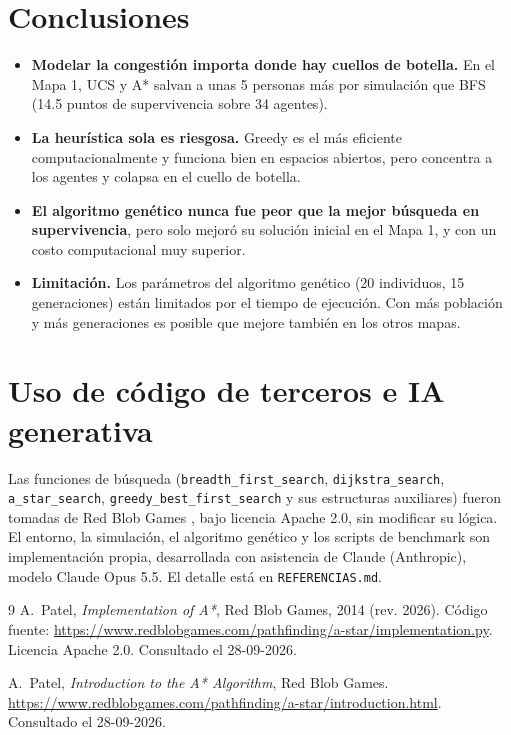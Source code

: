\documentclass[11pt,a4paper]{article}
\begin{document}
\section{Conclusiones}

\begin{itemize}
    \item \textbf{Modelar la congestión importa donde hay cuellos de botella.} En el Mapa 1, UCS y A* salvan a unas 5 personas más por simulación que BFS (14.5 puntos de supervivencia sobre 34 agentes).
    \item \textbf{La heurística sola es riesgosa.} Greedy es el más eficiente computacionalmente y funciona bien en espacios abiertos, pero concentra a los agentes y colapsa en el cuello de botella.
    \item \textbf{El algoritmo genético nunca fue peor que la mejor búsqueda en supervivencia}, pero solo mejoró su solución inicial en el Mapa 1, y con un costo computacional muy superior.
    \item \textbf{Limitación.} Los parámetros del algoritmo genético (20 individuos, 15 generaciones) están limitados por el tiempo de ejecución. Con más población y más generaciones es posible que mejore también en los otros mapas.
\end{itemize}

\section*{Uso de código de terceros e IA generativa}

Las funciones de búsqueda (\texttt{breadth\_first\_search}, \texttt{dijkstra\_search}, \texttt{a\_star\_search}, \texttt{greedy\_best\_first\_search} y sus estructuras auxiliares) fueron tomadas de Red Blob Games \cite{redblob-impl,redblob-intro}, bajo licencia Apache 2.0, sin modificar su lógica. El entorno, la simulación, el algoritmo genético y los scripts de benchmark son implementación propia, desarrollada con asistencia de Claude (Anthropic), modelo Claude Opus 5.5. El detalle está en \texttt{REFERENCIAS.md}.

\begin{thebibliography}{9}
A.~Patel, \emph{Implementation of A*}, Red Blob Games, 2014 (rev. 2026). Código fuente: \url{https://www.redblobgames.com/pathfinding/a-star/implementation.py}. Licencia Apache 2.0. Consultado el 28-09-2026.

A.~Patel, \emph{Introduction to the A* Algorithm}, Red Blob Games. \url{https://www.redblobgames.com/pathfinding/a-star/introduction.html}. Consultado el 28-09-2026.
\end{thebibliography}
\end{document}
